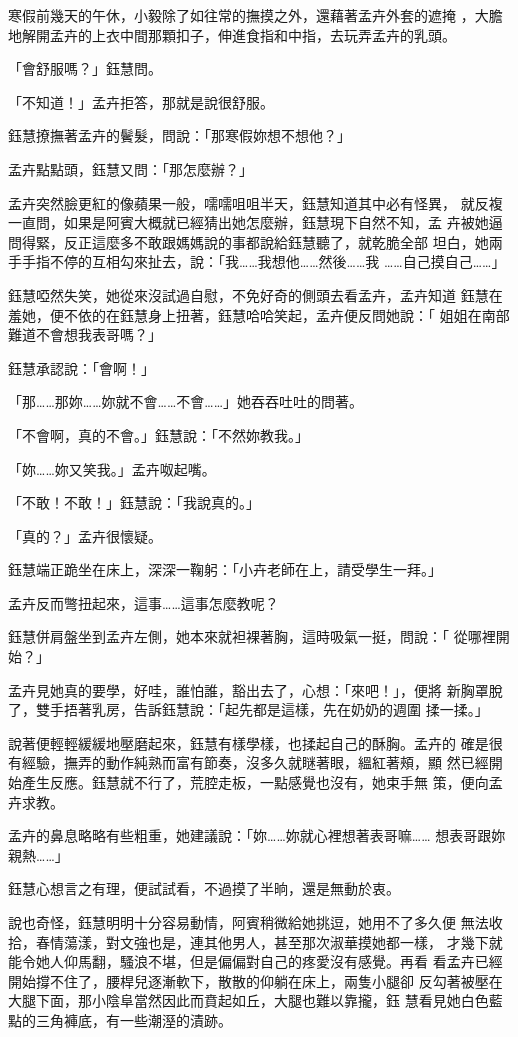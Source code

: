 寒假前幾天的午休，小毅除了如往常的撫摸之外，還藉著孟卉外套的遮掩
，大膽地解開孟卉的上衣中間那顆扣子，伸進食指和中指，去玩弄孟卉的乳頭。

「會舒服嗎？」鈺慧問。

「不知道！」孟卉拒答，那就是說很舒服。

鈺慧撩撫著孟卉的鬢髮，問說：「那寒假妳想不想他？」

孟卉點點頭，鈺慧又問：「那怎麼辦？」

孟卉突然臉更紅的像蘋果一般，嚅嚅咀咀半天，鈺慧知道其中必有怪異，
就反複一直問，如果是阿賓大概就已經猜出她怎麼辦，鈺慧現下自然不知，孟
卉被她逼問得緊，反正這麼多不敢跟媽媽說的事都說給鈺慧聽了，就乾脆全部
坦白，她兩手手指不停的互相勾來扯去，說：「我……我想他……然後……我
……自己摸自己……」

鈺慧啞然失笑，她從來沒試過自慰，不免好奇的側頭去看孟卉，孟卉知道
鈺慧在羞她，便不依的在鈺慧身上扭著，鈺慧哈哈笑起，孟卉便反問她說：「
姐姐在南部難道不會想我表哥嗎？」

鈺慧承認說：「會啊！」

「那……那妳……妳就不會……不會……」她吞吞吐吐的問著。

「不會啊，真的不會。」鈺慧說：「不然妳教我。」

「妳……妳又笑我。」孟卉呶起嘴。

「不敢！不敢！」鈺慧說：「我說真的。」

「真的？」孟卉很懷疑。

鈺慧端正跪坐在床上，深深一鞠躬：「小卉老師在上，請受學生一拜。」

孟卉反而彆扭起來，這事……這事怎麼教呢？

鈺慧併肩盤坐到孟卉左側，她本來就袒裸著胸，這時吸氣一挺，問說：「
從哪裡開始？」

孟卉見她真的要學，好哇，誰怕誰，豁出去了，心想：「來吧！」，便將
新胸罩脫了，雙手捂著乳房，告訴鈺慧說：「起先都是這樣，先在奶奶的週圍
揉一揉。」

說著便輕輕緩緩地壓磨起來，鈺慧有樣學樣，也揉起自己的酥胸。孟卉的
確是很有經驗，撫弄的動作純熟而富有節奏，沒多久就瞇著眼，縕紅著頰，顯
然已經開始產生反應。鈺慧就不行了，荒腔走板，一點感覺也沒有，她束手無
策，便向孟卉求教。

孟卉的鼻息略略有些粗重，她建議說：「妳……妳就心裡想著表哥嘛……
想表哥跟妳親熱……」

鈺慧心想言之有理，便試試看，不過摸了半晌，還是無動於衷。

說也奇怪，鈺慧明明十分容易動情，阿賓稍微給她挑逗，她用不了多久便
無法收拾，春情蕩漾，對文強也是，連其他男人，甚至那次淑華摸她都一樣，
才幾下就能令她人仰馬翻，騷浪不堪，但是偏偏對自己的疼愛沒有感覺。再看
看孟卉已經開始撐不住了，腰桿兒逐漸軟下，散散的仰躺在床上，兩隻小腿卻
反勾著被壓在大腿下面，那小陰阜當然因此而賁起如丘，大腿也難以靠攏，鈺
慧看見她白色藍點的三角褲底，有一些潮溼的漬跡。

